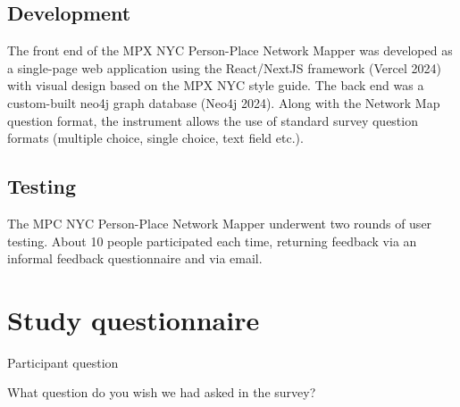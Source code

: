 \documentclass[
  letterpaper,
  DIV=11,
  numbers=noendperiod,
  oneside]{scrreprt}
\begin{document}
\hypertarget{development}{%
\subsection{Development}\label{development}}

The front end of the MPX NYC Person-Place Network Mapper was developed
as a single-page web application using the React/NextJS framework
(Vercel 2024) with visual design based on the MPX NYC style guide. The
back end was a custom-built neo4j graph database (Neo4j 2024). Along
with the Network Map question format, the instrument allows the use of
standard survey question formats (multiple choice, single choice, text
field etc.).

\hypertarget{testing}{%
\subsection{Testing}\label{testing}}

The MPC NYC Person-Place Network Mapper underwent two rounds of user
testing. About 10 people participated each time, returning feedback via
an informal feedback questionnaire and via email.

\hypertarget{sec-appendixquestionnaire}{%
\section{Study questionnaire}\label{sec-appendixquestionnaire}}

Participant question

What question do you wish we had asked in the survey?
\end{document}
